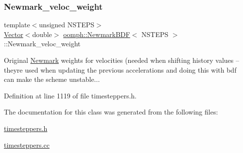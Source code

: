 \mbox{\label{classoomph_1_1NewmarkBDF_ac6032c3a2bd0f7c64f51ad3c84c3ca16}} 
\subsubsection{\texorpdfstring{Newmark\+\_\+veloc\+\_\+weight}{Newmark\_veloc\_weight}}
{\footnotesize\ttfamily template$<$unsigned N\+S\+T\+E\+PS$>$ \\
\hyperlink{classoomph_1_1Vector}{Vector}$<$double$>$ \hyperlink{classoomph_1_1NewmarkBDF}{oomph\+::\+Newmark\+B\+DF}$<$ N\+S\+T\+E\+PS $>$\+::Newmark\+\_\+veloc\+\_\+weight\hspace{0.3cm}{\ttfamily [private]}}



Original \hyperlink{classoomph_1_1Newmark}{Newmark} weights for velocities (needed when shifting history values -- they\textquotesingle{}re used when updating the previous accelerations and doing this with bdf can make the scheme unstable... 



Definition at line 1119 of file timesteppers.\+h.



The documentation for this class was generated from the following files\+:\begin{DoxyCompactItemize}
\item 
\hyperlink{timesteppers_8h}{timesteppers.\+h}\item 
\hyperlink{timesteppers_8cc}{timesteppers.\+cc}\end{DoxyCompactItemize}
